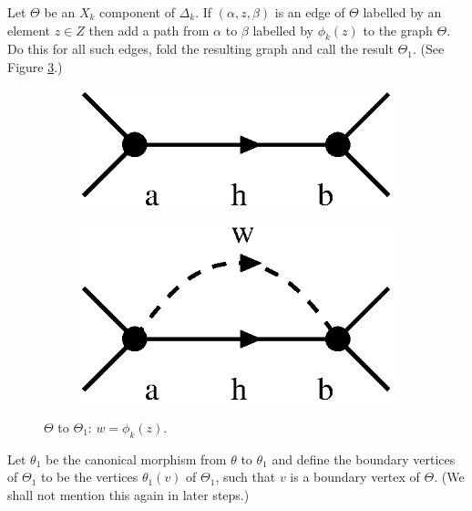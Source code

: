 \documentclass[a4paper,12pt]{article}
\renewcommand{\a}{\alpha }
\renewcommand{\b}{\beta }
\newcommand{\D}{\Delta }
\newcommand{\T}{\Theta }
\numberwithin{equation}{section}
\numberwithin{figure}{section}
\begin{document}
Let $\T$ be an $X_k$ component of $\D_k$. If $(\a,z,\b)$ is an
edge of $\T$ labelled by an element $z\in Z$ then add a path from
$\a$ to $\b$ labelled by $\phi_k(z)$ to the graph $\T$. Do this
for all such edges, fold the resulting graph and call the result
$\T_1$. (See Figure \ref{fig:alg2-1}.)
\begin{figure}
\begin{center}
\psfrag{a}{$\a$}
\psfrag{b}{$\b$}
\begin{subfigure}[b]{.25\columnwidth}
\includegraphics[scale=.5]{alg2-1a.eps}
\label{fig:alg2-1a}
\end{subfigure}
\raisebox{3ex}{$\leadsto$}
\begin{subfigure}[b]{.25\columnwidth}
\psfrag{a}{$\a$}
\psfrag{b}{$\b$}
\includegraphics[scale=.5]{alg2-1b.eps}
\label{fig:alg2-1b}
\end{subfigure}
\end{center}
\caption{$\Theta$ to $\Theta_1$: $w=\phi_k(z)$.}\label{fig:alg2-1}
\end{figure}
Let $\theta_1$ be the canonical morphism from $\theta$ to
$\theta_1$ and  define the boundary vertices of $\T_1$ to be the
vertices $\theta_1(v)$ of $\T_1$, such that $v$ is a boundary
vertex of $\T$. (We shall not mention this again in later
steps.)\\[1em]
\end{document}
